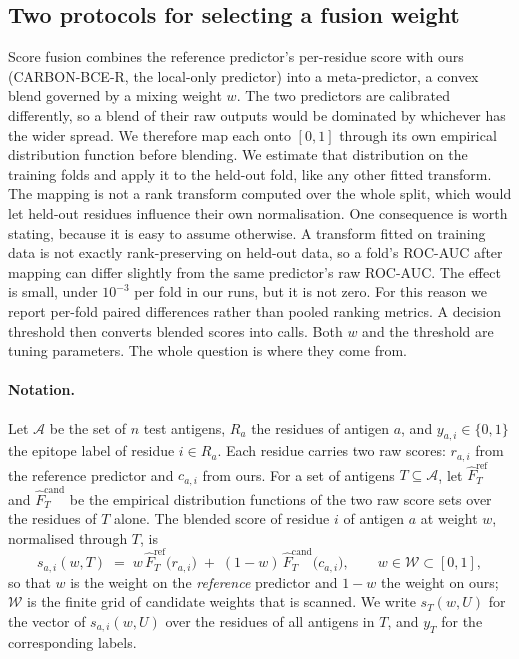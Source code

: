 \subsection{Two protocols for selecting a fusion weight}
\label{sec:fusion-protocol}

Score fusion combines the reference predictor's per-residue score with ours
(CARBON-BCE-R, the local-only predictor) into a meta-predictor,
a convex blend governed by a mixing weight \(w\). The two predictors are calibrated
differently, so a blend of their raw outputs would be dominated by whichever
has the wider spread. We therefore map each onto \([0,1]\) through its own
empirical distribution function before blending. We estimate that distribution
on the training folds and apply it to the held-out fold, like any other fitted
transform. The mapping is not a rank transform computed over the whole split,
which would let held-out residues influence their own normalisation. One consequence is worth
stating, because it is easy to assume otherwise. A transform fitted on training
data is not exactly
rank-preserving on held-out data, so a fold's ROC-AUC after mapping can differ
slightly from the same predictor's raw ROC-AUC. The effect is small, under
\(10^{-3}\) per fold in our runs, but it is not zero. For this reason we report
per-fold paired differences rather than pooled ranking metrics. A decision
threshold then converts
blended scores into calls. Both \(w\) and the threshold are tuning parameters.
The whole question is where they come from.

\paragraph{Notation.} Let \(\mathcal{A}\) be the set of \(n\) test antigens,
\(R_a\) the residues of antigen \(a\), and \(y_{a,i}\in\{0,1\}\) the epitope
label of residue \(i\in R_a\). Each residue carries two raw scores:
\(r_{a,i}\) from the reference predictor and \(c_{a,i}\) from ours. For a set
of antigens \(T\subseteq\mathcal{A}\), let \(\hat{F}^{\mathrm{ref}}_{T}\) and
\(\hat{F}^{\mathrm{cand}}_{T}\) be the empirical distribution functions of the
two raw score sets over the residues of \(T\) alone. The blended score of
residue \(i\) of antigen \(a\) at weight \(w\), normalised through \(T\), is
\begin{equation}
\label{eq:blend}
s_{a,i}(w,T) \;=\; w\,\hat{F}^{\mathrm{ref}}_{T}\!\bigl(r_{a,i}\bigr)
\;+\;(1-w)\,\hat{F}^{\mathrm{cand}}_{T}\!\bigl(c_{a,i}\bigr),
\qquad w\in\mathcal{W}\subset[0,1],
\end{equation}
so that \(w\) is the weight on the \emph{reference} predictor and \(1-w\) the
weight on ours; \(\mathcal{W}\) is the finite grid of candidate weights that is
scanned. We write \(s_{T}(w,U)\) for the vector of \(s_{a,i}(w,U)\) over the
residues of all antigens in \(T\), and \(y_{T}\) for the corresponding labels.


